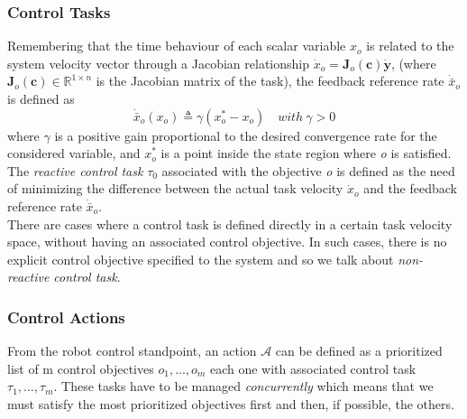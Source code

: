 \documentclass[a4paper, 12pt, notitlepage]{article}
\begin{document}
\begin{multicols}{2}
		
		\subsubsection{Control Tasks} \label{subsubsec:contrTask}
		\hspace{7px} Remembering that the time behaviour of each scalar variable $x_o$ is related
		to the system velocity vector through a Jacobian relationship
		$\dot{x}_o = \boldsymbol{J}_o(\boldsymbol{c})\boldsymbol{\dot{y}}$, (where $\boldsymbol{J}_o(\boldsymbol{c}) ∈ \mathbb{R}^{1×n}$ is the Jacobian matrix
		of the task), the feedback reference rate $\dot{\bar{x}}_o$ is defined as	
		\begin{equation}
			\dot{\bar{x}}_o(x_o)\triangleq\gamma(x_o^* - x_o)  \quad with \:\gamma>0
		\end{equation}
		where $\gamma$ is a positive gain proportional to the desired convergence rate for the considered variable, and $x_o^*$ is a point inside the state region where \textit{o} is satisfied.\\The \textit{reactive control task} $\tau_0$ associated with the objective \textit{o} is defined as the need of minimizing the difference between the actual task velocity $\dot{x}_o$ and the feedback reference rate $\dot{\bar{x}}_o$. \\
		\hspace*{7px}There are cases where a control task is defined directly in	a certain task velocity space, without having an associated control objective. In such cases, there is
		no explicit control objective specified to the system and so we talk about \textit{non-reactive control task}.
		
		\subsubsection{Control Actions}
		\hspace{7px} From the robot control standpoint, an action $\mathcal{A}$ can be defined as a prioritized list of m control objectives $o_1,...,o_m$ each one with associated control task $\tau_1,...,\tau_m$. These tasks have to be managed \textit{concurrently} which means that we must satisfy the most prioritized objectives first and then, if possible, the others.

		

\end{multicols}
\end{document}
